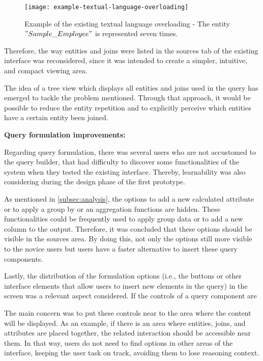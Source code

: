 \begin{figure}[htbp]
	\centering
	\texttt{[image: example-textual-language-overloading]}
	\caption{Example of the existing textual language overloading - The entity $"Sample\_Employee"$ is represented seven times. }
	\label{fig:exampleTextualLanguageOverloading}
\end{figure}

Therefore, the way entities and joins were listed in the sources tab of the existing interface was reconsidered, since it was intended to create a simpler, intuitive, and compact viewing area.

The idea of a tree view which displays all entities and joins used in the query has emerged to tackle the problem mentioned. Through that approach, it would be possible to reduce the entity repetition and to explicitly perceive which entities have a certain entity been joined.

\medskip

\textbf{Query formulation improvements: }

\medskip

Regarding query formulation, there was several users who are not accustomed to the query builder, that had difficulty to discover some functionalities of the system when they tested the existing interface. Thereby, learnability was also considering during the design phase of the first prototype.

As mentioned in \ref{subsec:analysis}, the options to add a new calculated attribute or to apply a group by or an aggregation functions are hidden. These functionalities could be frequently used to apply group data or to add a new column to the output. Therefore, it was concluded that these options should be visible in the sources area. By doing this, not only the options still more visible to the novice users but users have a faster alternative to insert these query components.


Lastly, the distribution of the formulation options (i.e., the buttons or other interface elements that allow users to insert new elements in the query) in the screen was a relevant aspect considered. If the controls of a query component are

The main concern was to put these controls near to the area where the content will be displayed. As an example, if there is an area where entities, joins, and attributes are placed together, the related interaction should be accessible near them. In that way, users do not need to find options in other areas of the interface, keeping the user task on track, avoiding them to lose reasoning context.

